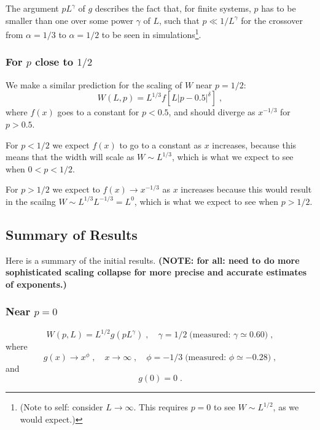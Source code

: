\documentclass[a4paper,10pt]{article}
\begin{document}
The argument $pL^\gamma$ of $g$ describes the fact that, for finite systems, $p$ has to be smaller than one over some power $\gamma$ of $L$, such that $p \ll 1/ L^\gamma $ for the crossover from $\alpha = 1/3$ to $\alpha = 1/2$ to be seen in simulations\footnote{(Note to self: consider $L \to \infty$. This requires $p=0$ to see $W \sim L^{1/2}$, as we would expect.)}.

\subsubsection{For $p$ close to $1/2$}

We make a similar prediction for the scaling of $W$ near $p = 1/2$:
\begin{equation}\label{eq:p0.5g_scaling}
  W(L,p)= L^{1/3} f[L|p-0.5|^\delta] \;,
\end{equation}
where $f(x)$ goes to a constant for $p<0.5$, and should diverge as $x^{-1/3}$ for $p>0.5$.

For $p<1/2$ we expect $f(x)$ to go to a constant as $x$ increases, because this means that the width will scale as $W \sim L^{1/3}$, which is what we expect to see when $0 < p < 1/2$.

For $p > 1/2$ we expect to $f(x) \to x^{-1/3}$ as $x$ increases because this would result in the scailng $W \sim L^{1/3}L^{-1/3} = L^0$, which is what we expect to see when $p>1/2$.


\subsection{Summary of Results}

Here is a summary of the initial results. {\bf (NOTE: for all: need to do more sophisticated scaling collapse for more precise and accurate estimates of exponents.)}

\subsubsection{Near $p=0$}

\begin{equation}
  W(p,L) = L^{1/2} g(pL^\gamma) \;, \quad \gamma = 1/2 \; \mbox{(measured: $\gamma \simeq 0.60$)} \;,
\end{equation}
where
\begin{equation}
 g(x) \to x^\phi \;, \quad x\to\infty \;, \quad\phi = -1/3\; \mbox{(measured: $\phi \simeq -0.28$)} \;,
\end{equation}
and
\begin{equation}
  g(0) = 0 \;.
\end{equation}
\end{document}
